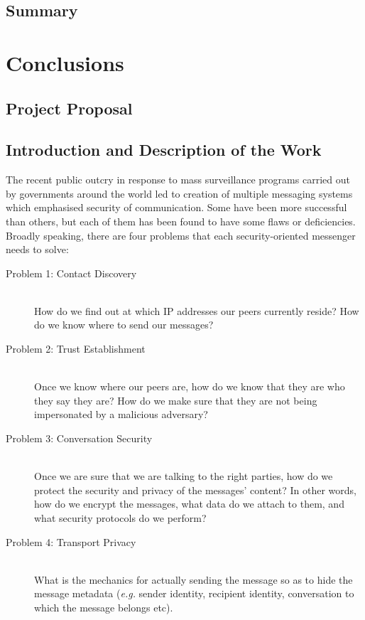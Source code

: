 \documentclass[a4paper, 12pt]{report}
\begin{document}
\section{Summary}


\chapter{Conclusions}






\begin{appendices}
\chapter{Project Proposal}
\label{appendix:proposal}
\section{Introduction and Description of the Work}
\label{intro}
The recent public outcry in response to mass surveillance programs carried out by governments around the world led to creation of multiple messaging systems which emphasised security of communication. Some have been more successful than others, but each of them has been found to have some flaws or deficiencies. Broadly speaking, there are four problems that each security-oriented messenger needs to solve:
\begin{description}
    \item[Problem 1: Contact Discovery] \hfill \\
        How do we find out at which IP addresses our peers currently reside? How do we know where to send our messages?
    \item[Problem 2: Trust Establishment]\hfill \\
        Once we know where our peers are, how do we know that they are who they say they are? How do we make sure that they are not being impersonated by a malicious adversary?
    \item[Problem 3: Conversation Security]\hfill \\
        Once we are sure that we are talking to the right parties, how do we protect the security and privacy of the messages' content? In other words, how do we encrypt the messages, what data do we attach to them, and what security protocols do we perform?
    \item[Problem 4: Transport Privacy]\hfill \\
        What is the mechanics for actually sending the message so as to hide the message metadata (\textit{e.g.} sender identity, recipient identity, conversation to which the message belongs etc).
\end{description}


\end{appendices}
\end{document}
